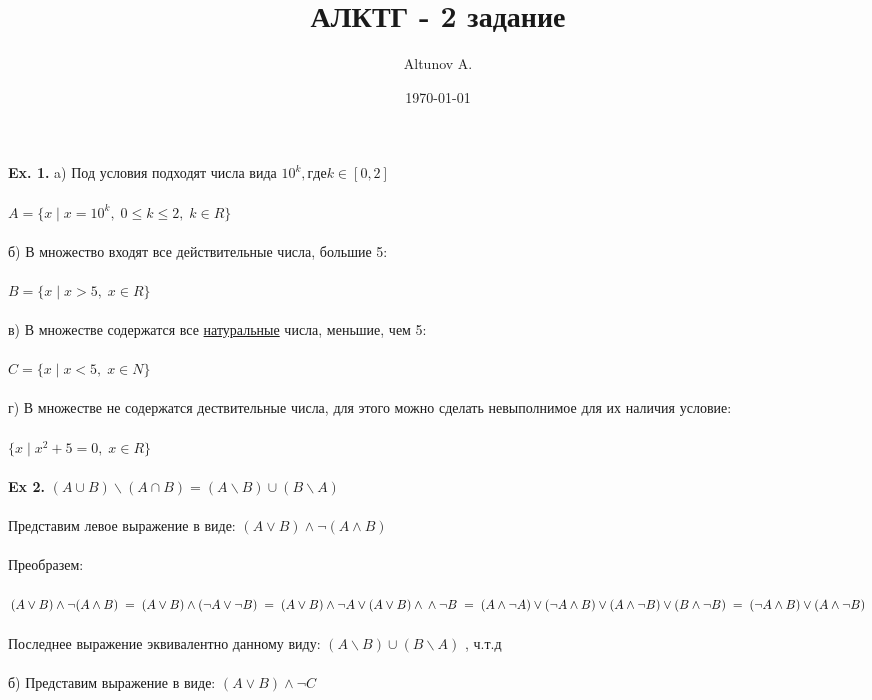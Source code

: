 \documentclass[a4paper,12pt]{article}
\author{Altunov A.}
\title{АЛКТГ - 2 задание}
\date{\today}
\begin{document}
\maketitle
\newpage
\textbf{Ex. 1.} 
 a) Под условия подходят числа вида $ 10^k, где k \in [0,2] $
\\
\\
$ A = \lbrace x \; | \;  x = 10^k, \; 0 \leq k \leq 2, \;  k \in R \rbrace $
\\
\\
б) В множество входят все действительные числа, большие 5:
\\
\\
$ B = \lbrace x \;|\;  x > 5, \;  x \in R \rbrace $
\\
\\
в) В множестве содержатся все \underline{натуральные} числа, меньшие, чем 5:
\\
\\
$ C = \lbrace x \; | \; x < 5, \; x \in N \rbrace $
\\
\\
г) В множестве не содержатся дествительные числа, для этого можно сделать невыполнимое для их наличия условие:
\\
\\
$ \lbrace x \; | \; x^2 + 5 = 0, \; x \in R \rbrace $
\\
\\
\textbf{Ex 2.} 
 $(A \cup B) \backslash (A \cap B)=(A \backslash B) \cup (B \backslash A)$
\\
\\
Представим левое выражение в виде:
$ (A \vee B )\wedge \neg (A \wedge B) $
\\
\\
Преобразем:
\\
\\
$ (A \vee B )\wedge \neg (A \wedge B) \; = \; (A \vee B )\wedge (\neg A \vee \neg B) \; = \; (A \vee B) \wedge \neg A \vee (A \vee B) \wedge \\ \wedge \neg B \; = \; (A \wedge \neg A) \vee (\neg A \wedge B) \vee (A \wedge \neg B) \vee (B \wedge \neg B) \; = \;(\neg A \wedge B) \vee (A \wedge \neg B)$
\\
\\
Последнее выражение эквивалентно данному виду: $ (A \backslash B) \cup (B \backslash A) $
, \; ч.т.д
\\
\\
б) Представим выражение в виде: $ (A \vee B) \wedge \neg C $
\\
\\
\end{document}
